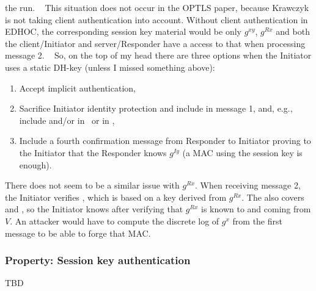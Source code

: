 \documentclass[a4paper,11pt]{article}
\theoremstyle{plain}
\theoremstyle{plain}
\begin{document}
the run.
%
 
This situation does not occur in the OPTLS paper, because Krawczyk is not
taking client authentication into account.
%
Without client authentication in EDHOC, the corresponding session key material
would be only $g^{xy}$, $g^{Rx}$ and both the client/Initiator and
server/Responder have a access to that when processing message 2.
%
 
So, on the top of my head there are three options when the Initiator uses a
static DH-key (unless I missed something above):
\begin{enumerate}
    \item Accept implicit authentication,
    \item Sacrifice Initiator identity protection and include
         in message 1, and, e.g., include
         and/or 
        in  or in ,
    \item Include a fourth confirmation message from Responder to Initiator
        proving to the Initiator that the Responder knows $g^{Iy}$ (a MAC using
        the session key is enough).
\end{enumerate}
% 
There does not seem to be a similar issue with $g^{Rx}$.
%
When receiving message 2, the Initiator verifies , which is
based on a key derived from $g^{Rx}$.
%
The  also covers  and
, so the Initiator knows after verifying
 that $g^{Rx}$ is known to and coming from $V$.
%
An attacker would have to compute the discrete log of $g^{x}$ from the first
message to be able to forge that MAC.
% 

\subsubsection{Property: Session key authentication}
%
TBD
%
\end{document}
